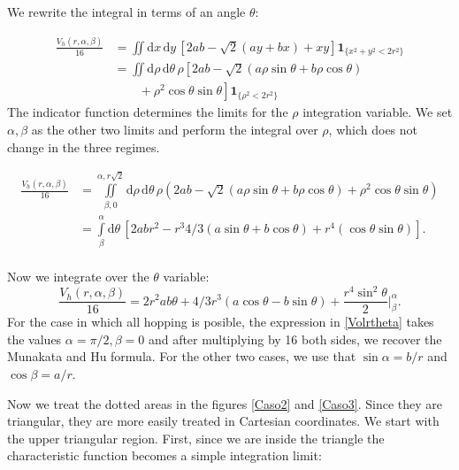 \documentclass[superscriptaddress,pre,reprint,showpacs,twocolumn]{revtex4-1}
\newcommand{\rd}[1]{\mathrm{d}{#1} \,}
\newcommand{\indicatorsymbol}{\mathbf{1}}
\newcommand{\indicator}[1]{\indicatorsymbol_{ \{   #1 \} } }
\begin{document}
We rewrite the integral in terms of an angle $\theta$:

\begin{equation}\label{app:volcyl}
\begin{split}
\frac{V_h(r,\alpha,\beta)}{16} &=
\iint \rd x \rd y \left[ 2ab-\sqrt{2}(ay+bx)+x y \right]
\indicator{x^2 + y^2 < 2r^2}\\
&=
\iint \rd \rho \rd \theta \rho 
\left[ 2ab -\sqrt{2}(a\rho\sin\theta+b\rho\cos\theta) \right. \\
& \qquad + \left. \rho^2 \cos\theta\sin\theta \right]
\indicator{\rho^2<2r^2 }
\end{split}
\end{equation}
The indicator function determines the limits for the $\rho$ integration variable.
We set $\alpha, \beta$ as the other two limits and perform the
integral over $\rho$, which does not change in the three regimes.
\begin{widetext}
\begin{equation}
  \begin{split}
    \frac{V_h(r,\alpha,\beta)}{16} &=
    \iint\limits_{\beta,0}^{\alpha,r\sqrt{2}} \rd \rho \rd \theta \rho
    \left( 2ab -\sqrt{2}(a\rho\sin\theta+b\rho\cos\theta) 
    +\rho^2 \cos\theta\sin\theta \right)\\
 &=\int\limits_\beta^{\alpha}  \rd \theta  
\left[ 2abr^2 - r^3 4/3 (a\sin\theta+b\cos\theta)+r^4 (\cos\theta\sin\theta) \right].\\
\end{split}
\end{equation}
\end{widetext}
Now we integrate over the $\theta$ variable:
\begin{equation}\label{Volrtheta}
  \frac{V_h(r,\alpha,\beta)}{16} = 2r^2ab\theta
  +4/3r^3(a\cos\theta-b\sin\theta)
  +\frac{r^4 \sin^2\theta}{2} \Bigg\vert_\beta^\alpha.
\end{equation}
For the case in which all hopping is posible, the expression in \eqref{Volrtheta}
takes the values $\alpha=\pi/2, \beta=0$ and after multiplying by 16 both sides,
we recover the Munakata and Hu formula. For the other two cases, we use that
$\sin \alpha = b / r$ and $\cos \beta = a / r$.




Now we treat the dotted areas in the figures \ref{Caso2} and \ref{Caso3}. Since they are triangular, they
are more easily treated in Cartesian coordinates. We start with the upper
triangular region.
First, since we are inside the triangle the characteristic function
becomes a simple integration limit:
\end{document}
